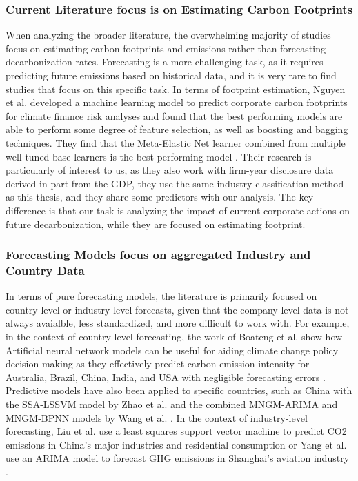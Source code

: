 \subsubsection{Current Literature focus is on Estimating Carbon Footprints}
When analyzing the broader literature, the overwhelming majority of studies focus on estimating carbon footprints and emissions rather than forecasting decarbonization rates. Forecasting is a more challenging task, as it requires predicting future emissions based on historical data, and it is very rare to find studies that focus on this specific task. In terms of footprint estimation, Nguyen et al. developed a machine learning model to predict corporate carbon footprints for climate finance risk analyses \cite{nguyen-ml} and found that the best performing models are able to perform some degree of feature selection, as well as boosting and bagging techniques. They find that the Meta-Elastic Net learner combined from multiple well-tuned base-learners is the best performing model \cite{nguyen-ml}. Their research is particularly of interest to us, as they also work with firm-year disclosure data derived in part from the GDP, they use the same industry classification method as this thesis, and they share some predictors with our analysis. The key difference is that our task is analyzing the impact of current corporate actions on future decarbonization, while they are focused on estimating footprint. 


\subsubsection{Forecasting Models focus on aggregated Industry and Country Data}
In terms of pure forecasting models, the literature is primarily focused on country-level or industry-level forecasts, given that the company-level data is not always avaialble, less standardized, and more difficult to work with. For example, in the context of country-level forecasting, the work of Boateng et al. show how Artificial neural network models can be useful for aiding climate change policy decision-making as they effectively predict carbon emission intensity for Australia, Brazil, China, India, and USA with negligible forecasting errors \cite{acheampong}. Predictive models have also been applied to specific countries, such as China with the SSA-LSSVM model by Zhao et al. and the combined MNGM-ARIMA and MNGM-BPNN models by Wang et al. \cite{wangfs, zhaofs}. In the context of industry-level forecasting, Liu et al. use a least squares support vector machine to predict CO2 emissions in China's major industries and residential consumption \cite{liu} or Yang et al. use an ARIMA model to forecast GHG emissions in Shanghai's aviation industry \cite{yang}. 


